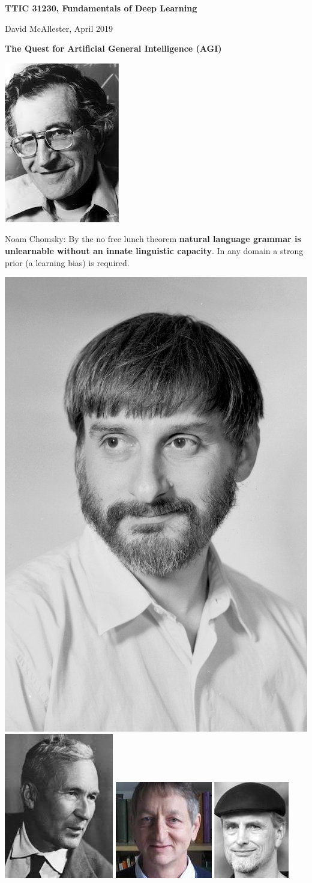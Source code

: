 




{\Huge

  \centerline{\bf TTIC 31230, Fundamentals of Deep Learning}
  \bigskip
  \centerline{David McAllester, April 2019}

\vfill
  \centerline{\bf The Quest for Artificial General Intelligence (AGI)}
  
  \vfill


\includegraphics[width=1.0 in]{../images/Chomsky} \begin{minipage}[b]{8in} Noam Chomsky: 
  By the no free lunch theorem {\bf natural language grammar is unlearnable without an innate linguistic capacity}. In any domain a strong prior (a learning bias)
  is required. \end{minipage}

\vfill
\includegraphics[height=1.0 in]{../images/Levin}
\includegraphics[height=1.0 in]{../images/Kolmogorov}
\includegraphics[height=1.0 in]{../images/Hinton}
\includegraphics[height=1.0 in]{../images/Schmidhuber}

}
